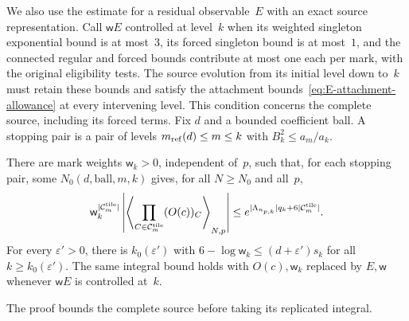 We also use the estimate for a residual observable~$E$ with an exact source representation. Call $\mathsf wE$ controlled at level~$k$ when its weighted singleton exponential bound is at most~$3$, its forced singleton bound is at most~$1$, and the connected regular and forced bounds contribute at most one each per mark, with the original eligibility tests. The source evolution from its initial level down to~$k$ must retain these bounds and satisfy the attachment bounds~\eqref{eq:E-attachment-allowance} at every intervening level. This condition concerns the complete source, including its forced terms.
Fix $d$ and a bounded coefficient ball. A stopping pair is a pair of levels $m_{\mathrm{ref}}(d)\le m\le k$ with $B_k^2\le a_m/a_k$.
\begin{lemma}\label{lem:E-replication}
There are mark weights $\mathsf w_k>0$, independent of~$p$, such that, for each stopping pair, some $N_0(d,\text{ball},m,k)$ gives, for all $N\ge N_0$ and all~$p$,
\begin{equation*}
 \mathsf w_k^{|\mathcal C^{\rm tile}_m|}
 \left|\left\langle\prod_{C\in\mathcal C^{\rm tile}_m}(O(c))_C\right\rangle_{N,p}\right|
 \le e^{|\Lambda_{n_{p,k}}|q_k+6|\mathcal C^{\rm tile}_m|}.
\end{equation*}
For every $\varepsilon'>0$, there is $k_0(\varepsilon')$ with $6-\log\mathsf w_k\le(d+\varepsilon')s_k$ for all $k\ge k_0(\varepsilon')$.
The same integral bound holds with $O(c),\mathsf w_k$ replaced by $E,\mathsf w$ whenever $\mathsf wE$ is controlled at~$k$.
\end{lemma}
The proof bounds the complete source before taking its replicated integral.
